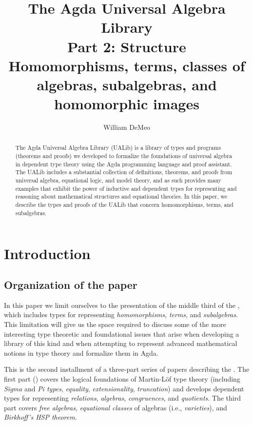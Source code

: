 \documentclass[a4paper,UKenglish,cleveref,autoref,thm-restate,12pt]{../lipics-v2021-wjd}
\title{The Agda Universal Algebra Library\\%
Part 2: Structure\\[-5pt]
{\large Homomorphisms, terms, classes of algebras, subalgebras, and homomorphic images}}
\author{William DeMeo}
       {Department of Algebra, Charles University in Prague \and \url{https://williamdemeo.gitlab.io}}
       {williamdemeo@gmail.com}{https://orcid.org/0000-0003-1832-5690}{}
\begin{document}
\maketitle


\begin{abstract}
The Agda Universal Algebra Library (UALib) is a library of types and programs (theorems and proofs) we developed to formalize the foundations of universal algebra in dependent type theory using the Agda programming language and proof assistant. 
 The UALib includes a substantial collection of definitions, theorems, and proofs from universal algebra, equational logic, and model theory, and as such provides many examples that exhibit the power of inductive and dependent types for representing and reasoning about mathematical structures and equational theories. In this paper, we describe the types and proofs of the UALib that concern homomorphisms, terms, and subalgebras.
\end{abstract}

\setcounter{tocdepth}{2}
\tableofcontents


\section{Introduction}\label{sec:introduction}


\subsection{Organization of the paper}\label{sec:organization}

In this paper we limit ourselves to the presentation of the middle third of the \ualib, which includes types for representing \emph{homomorphisms}, \emph{terms}, and \emph{subalgebras}. This limitation will give us the space required to discuss some of the more interesting type theoretic and foundational issues that arise when developing a library of this kind and when attempting to represent advanced mathematical notions in type theory and formalize them in Agda.

This is the second installment of a three-part series of papers describing the \agdaualib. The first part (\cite{DeMeo:2021-1}) covers the logical foundations of Martin-L\"of type theory (including \emph{Sigma} and \emph{Pi types}, \emph{equality}, \emph{extensionality}, \emph{truncation}) and develops dependent types for representing \emph{relations}, \emph{algebras}, \emph{congruences}, and \emph{quotients}. The third part covers \emph{free algebras}, \emph{equational classes} of algebras (i.e., \emph{varieties}), and \emph{Birkhoff's HSP theorem}.
\end{document}
